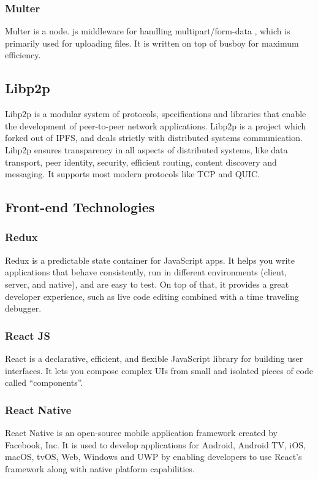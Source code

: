     \subsubsection{Multer}
    Multer is a node. js middleware for handling multipart/form-data , 
    which is primarily used for uploading files. It is written on top of busboy for maximum efficiency.

    \subsection{Libp2p}
    Libp2p is a modular system of protocols, specifications and libraries that enable the development of peer-to-peer network applications. 
    Libp2p is a project which forked out of IPFS, and deals strictly with distributed systems communication. Libp2p ensures transparency in 
    all aspects of distributed systems, like data transport, peer identity, security, efficient routing, content discovery and messaging. It 
    supports most modern protocols like TCP and QUIC.

\subsection{Front-end Technologies}

    \subsubsection{Redux}
    Redux is a predictable state container for JavaScript apps.
    It helps you write applications that behave consistently, run in different environments 
    (client, server, and native), and are easy to test. On top of that, it provides a great developer experience, 
    such as live code editing combined with a time traveling debugger.
    
    \subsubsection{React JS}
    React is a declarative, efficient, and flexible JavaScript library for building user interfaces. 
    It lets you compose complex UIs from small and isolated pieces of code called “components”.

    \subsubsection{React Native}
    React Native is an open-source mobile application framework created by Facebook, Inc.
    It is used to develop applications for Android, Android TV, iOS, macOS, tvOS, Web, Windows and UWP by enabling 
    developers to use React's framework along with native platform capabilities.


